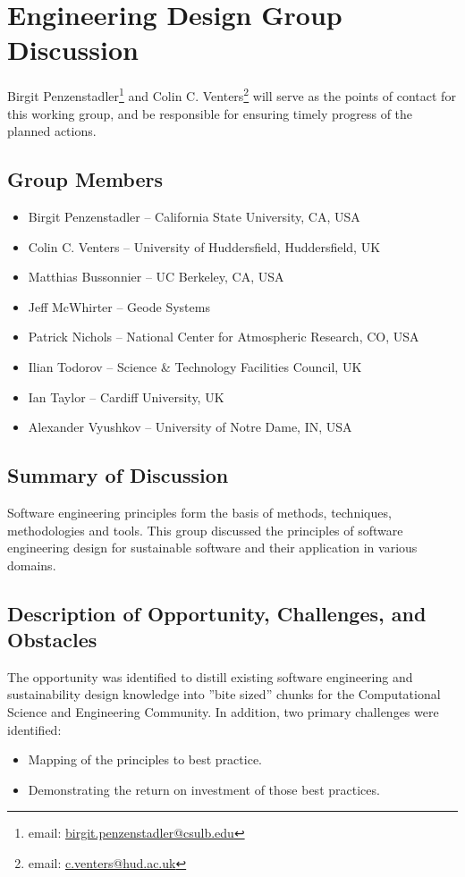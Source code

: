 \section{Engineering Design Group Discussion}
\label{sec:appendix_eng_design}

Birgit Penzenstadler\footnote{email: \href{mailto:birgit.penzenstadler@csulb.edu}{birgit.penzenstadler@csulb.edu}} and Colin C. Venters\footnote{email: \href{mailto:c.venters@hud.ac.uk}{c.venters@hud.ac.uk}} will serve as the points of contact for this working group, and be responsible for ensuring timely progress of the planned actions.

\subsection{Group Members}

\begin{itemize}
\item Birgit Penzenstadler -- California State University, CA, USA
\item Colin C. Venters -- University of Huddersfield, Huddersfield, UK
\item Matthias Bussonnier -- UC Berkeley, CA, USA
\item Jeff McWhirter -- Geode Systems 
\item Patrick Nichols -- National Center for Atmospheric Research, CO, USA
\item Ilian Todorov -- Science \& Technology Facilities Council, UK
\item Ian Taylor -- Cardiff University, UK
\item Alexander Vyushkov -- University of Notre Dame, IN, USA
\end{itemize}

\subsection{Summary of Discussion}
Software engineering principles form the basis of methods, techniques, methodologies and tools. This group discussed the principles of software engineering design for sustainable software and their application in various domains. 

\subsection{Description of Opportunity, Challenges, and Obstacles}
The opportunity was identified to distill existing software engineering and sustainability design knowledge into ''bite sized'' chunks for the Computational Science and Engineering Community. In addition, two primary challenges were identified:
\begin{itemize}
\item Mapping of the principles to best practice.
\item Demonstrating the return on investment of those best practices.
\end{itemize}

